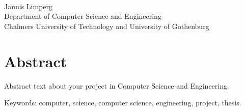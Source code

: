 \oneLineTitle\\
Jannis Limperg\\
Department of Computer Science and Engineering\\
Chalmers University of Technology and University of Gothenburg\setlength{\parskip}{0.5cm}

\thispagestyle{plain}			%
\setlength{\parskip}{0pt plus 1.0pt}
\section*{Abstract}
Abstract text about your project in  Computer Science and Engineering.

\vfill
Keywords: computer, science, computer science, engineering, project, thesis.

\newpage				%
\thispagestyle{empty}
\mbox{}